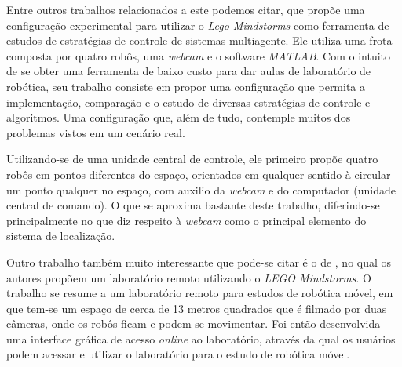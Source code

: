 Entre outros trabalhos relacionados a este podemos citar,  que propõe uma configuração experimental para utilizar o \emph{Lego  Mindstorms\textregistered} como ferramenta de estudos de estratégias de controle de sistemas multiagente. Ele utiliza uma frota composta por quatro robôs, uma \emph{webcam} e o software \emph{MATLAB{\textregistered}}. Com o intuito de se obter uma ferramenta de baixo custo para dar aulas de laboratório de robótica, seu trabalho consiste em propor uma configuração que permita a implementação, comparação e o estudo de diversas estratégias de controle e algoritmos. Uma configuração que, além de tudo, contemple muitos dos problemas vistos em um cenário real. 

Utilizando-se de uma unidade central de controle, ele primeiro propõe quatro robôs em pontos diferentes do espaço, orientados em qualquer sentido à circular um ponto qualquer no espaço, com auxilio da \emph{webcam} e do computador (unidade central de comando). O que se aproxima bastante deste trabalho, diferindo-se principalmente no que diz respeito à \emph{webcam} como o principal elemento do sistema de localização. %

Outro trabalho também muito interessante que pode-se citar é o de , no qual os autores propõem um laboratório remoto utilizando o \emph{LEGO  Mindstorms\textregistered}. O trabalho se resume  a um laboratório remoto para estudos de robótica móvel, em que tem-se um espaço de cerca de 13 metros quadrados que é filmado por duas câmeras, onde os robôs ficam e podem se movimentar. Foi então desenvolvida uma interface gráfica de acesso \emph{online} ao laboratório, através da qual os usuários podem acessar e utilizar o laboratório para o estudo de robótica móvel. 

